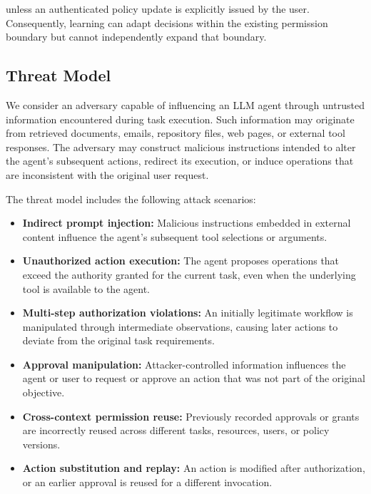\documentclass[10pt,conference]{IEEEtran}
\begin{document}
unless an authenticated policy update is explicitly issued by the user. Consequently, learning can adapt decisions within the existing permission boundary but cannot independently expand that boundary.

\subsection{Threat Model}

We consider an adversary capable of influencing an LLM agent through untrusted information encountered during task execution. Such information may originate from retrieved documents, emails, repository files, web pages, or external tool responses. The adversary may construct malicious instructions intended to alter the agent's subsequent actions, redirect its execution, or induce operations that are inconsistent with the original user request.

The threat model includes the following attack scenarios:

\begin{itemize}

    \item \textbf{Indirect prompt injection:}
    Malicious instructions embedded in external content influence the agent's subsequent tool selections or arguments.

    \item \textbf{Unauthorized action execution:}
    The agent proposes operations that exceed the authority granted for the current task, even when the underlying tool is available to the agent.

    \item \textbf{Multi-step authorization violations:}
    An initially legitimate workflow is manipulated through intermediate observations, causing later actions to deviate from the original task requirements.

    \item \textbf{Approval manipulation:}
    Attacker-controlled information influences the agent or user to request or approve an action that was not part of the original objective.

    \item \textbf{Cross-context permission reuse:}
    Previously recorded approvals or grants are incorrectly reused across different tasks, resources, users, or policy versions.

    \item \textbf{Action substitution and replay:}
    An action is modified after authorization, or an earlier approval is reused for a different invocation.
    
\end{itemize}
\end{document}
